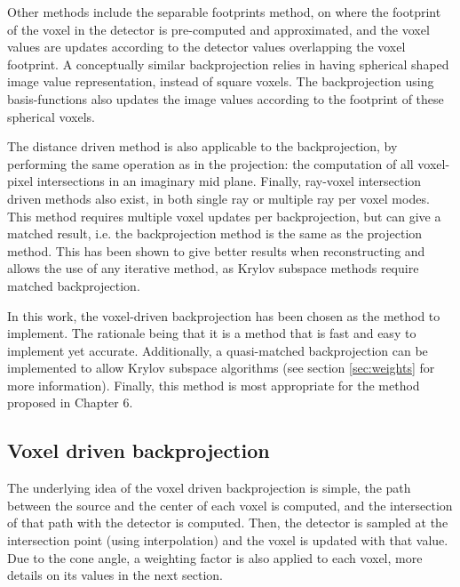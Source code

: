  Other methods include the separable footprints method\cite{long20103d}, on where the footprint of the voxel in the detector is pre-computed and approximated, and the voxel values are updates according to the detector values overlapping the voxel footprint. A conceptually similar backprojection relies in having spherical shaped image value representation, instead of square voxels\cite{spherical}. The backprojection using basis-functions also updates the image values according to the footprint of these spherical voxels.
 
 The distance driven method\cite{schlifske2016fast} is also applicable to the backprojection, by performing the same operation as in the projection: the computation of all voxel-pixel intersections in an imaginary mid plane. Finally, ray-voxel intersection driven methods also exist\cite{park2015fully}, in both single ray or multiple ray per voxel modes. This method requires multiple voxel updates per backprojection, but can give a matched result, i.e. the backprojection method is the same as the projection method. This has been shown to give better results when reconstructing\cite{6829349} and allows the use of any iterative method, as Krylov subspace methods require matched backprojection. 
 
 In this work, the voxel-driven backprojection has been chosen as the method to implement. The rationale being that it is a method that is fast and easy to implement yet accurate. Additionally, a quasi-matched backprojection can be implemented to allow Krylov subspace algorithms (see section \ref{sec:weights} for more information). Finally, this method is most appropriate for the method proposed in Chapter 6.
 

\subsection{Voxel driven backprojection}

The underlying idea of the voxel driven backprojection is simple, the path between the source and the center of each voxel is computed, and the intersection of that path with the detector is computed. Then, the detector is sampled at the intersection point (using interpolation) and the voxel is updated with that value. Due to the cone angle, a weighting factor is also applied to each voxel, more details on its values in the next section.

